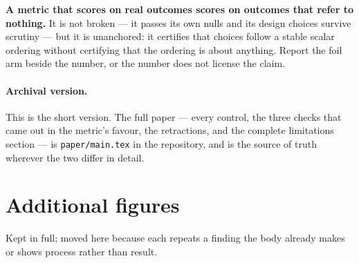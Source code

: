 \documentclass[11pt,a4paper]{article}
\begin{document}
\textbf{A metric that scores \MeanR{} on real outcomes scores \MeanFloor{} on
outcomes that refer to nothing.} It is not broken --- it passes its own nulls
and its design choices survive scrutiny --- but it is unanchored: it certifies
that choices follow a stable scalar ordering without certifying that the
ordering is about anything. Report the foil arm beside the number, or the number
does not license the claim.

\paragraph{Archival version.} This is the short version. The full paper ---
every control, the three checks that came out in the metric's favour, the
retractions, and the complete limitations section --- is \texttt{paper/main.tex}
in the repository, and is the source of truth wherever the two differ in detail.




\appendix

\section{Additional figures}\label{app:figs}

Kept in full; moved here because each repeats a finding the body already makes
or shows process rather than result.
\end{document}
